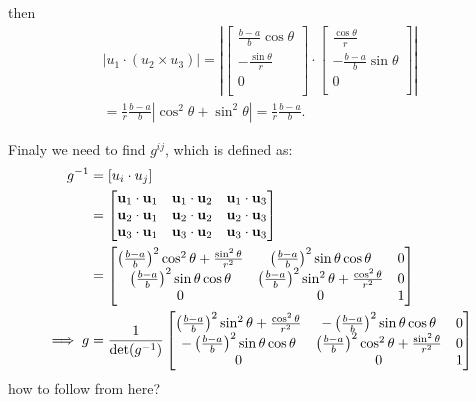 \documentclass{amsart}
\begin{document}
then
\begin{multline}
  |u_1\cdot(u_2\times u_3)|=
  \left|
  \begin{bmatrix}
    \frac{b-a}{b}\cos\theta\\
    -\frac{\sin\theta}{r}\\
    0\\
  \end{bmatrix}
  \cdot
  \begin{bmatrix}
    \frac{\cos\theta}{r}\\
    -\frac{b-a}{b}\sin\theta\\
    0\\
  \end{bmatrix}\right|\\
  =\frac{1}{r}\frac{b-a}{b}|\cos^2\theta+\sin^2\theta|
  =\frac{1}{r}\frac{b-a}{b}.
\end{multline}

Finaly we need to find $g^{ij}$, which is defined as:
\begin{align*}\label{matrixg}
  g^{-1}&=[u_i\cdot u_j]\\
  &=\begin{bmatrix}
    \textbf{u}_1\cdot \textbf{u}_1 & \textbf{u}_1\cdot \textbf{u}_2 & \textbf{u}_1\cdot \textbf{u}_3 \\
    \textbf{u}_2\cdot \textbf{u}_1 & \textbf{u}_2\cdot \textbf{u}_2 & \textbf{u}_2\cdot \textbf{u}_3 \\
    \textbf{u}_3\cdot \textbf{u}_1 & \textbf{u}_3\cdot \textbf{u}_2 & \textbf{u}_3\cdot \textbf{u}_3
  \end{bmatrix}\\
  &=\begin{bmatrix}
    \left(\frac{b-a}{b}\right)^2\cos^2\theta + \frac{\sin^2\theta}{r^2} & \left(\frac{b-a}{b}\right)^2\sin\theta\cos\theta & 0\\
    \left(\frac{b-a}{b}\right)^2\sin\theta\cos\theta & \left(\frac{b-a}{b}\right)^2\sin^2\theta + \frac{\cos^2\theta}{r^2} & 0\\
    0 & 0 & 1
  \end{bmatrix}\\
  \implies
  g&=\frac{1}{\det(g^{-1})}\begin{bmatrix}
    \left(\frac{b-a}{b}\right)^2\sin^2\theta + \frac{\cos^2\theta}{r^2} & -\left(\frac{b-a}{b}\right)^2\sin\theta\cos\theta & 0\\
    -\left(\frac{b-a}{b}\right)^2\sin\theta\cos\theta & \left(\frac{b-a}{b}\right)^2\cos^2\theta + \frac{\sin^2\theta}{r^2} & 0\\
    0 & 0 & 1
  \end{bmatrix}\\
\end{align*}
how to follow from here?
\end{document}
